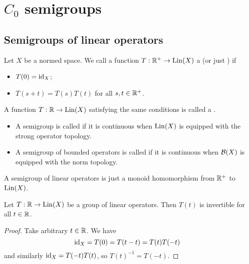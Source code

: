 \chapter{$C_0$ semigroups}
\section{Semigroups of linear operators}
\begin{definition}
Let $X$ be a normed space. We call a function $T: \mathbb{R}^+ \to \operatorname{Lin}(X)$ a  (or just ) if
\begin{itemize}
\item $T(0) = \operatorname{id}_X$;
\item $T(s+t) = T(s)T(t)$ for all $s,t \in \mathbb{R}^+$.
\end{itemize}
A function $T: \mathbb{R} \to \operatorname{Lin}(X)$ satisfying the same conditions is called a .
\begin{itemize}
\item A semigroup is called  if it is continuous when $\operatorname{Lin}(X)$ is equipped with the strong operator topology.
\item A semigroup of bounded operators is called  if it is continuous when $\operatorname{\mathcal{B}}(X)$ is equipped with the norm topology.
\end{itemize}
\end{definition}
A semigroup of linear operators is just a monoid homomorphism from $\mathbb{R}^+$ to $\operatorname{Lin}(X)$.

\begin{lemma}
Let $T:\mathbb{R}\to \operatorname{Lin}(X)$ be a group of linear operators. Then $T(t)$ is invertible for all $t\in \mathbb{R}$.
\end{lemma}
\begin{proof}
Take arbitrary $t\in \mathbb{R}$. We have
\[ \operatorname{id}_X = T(0) = T(t-t) = T(t)T(-t) \]
and similarly $\operatorname{id}_X = T(-t)T(t)$, so $T(t)^{-1} = T(-t)$.
\end{proof}

